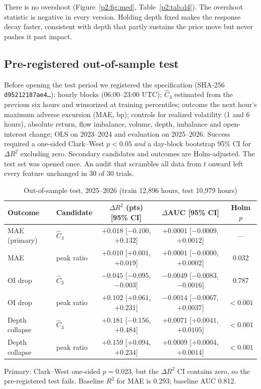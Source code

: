 There is no overshoot (Figure~\ref{p2:fig:med}, Table~\ref{p2:tab:d4}). The overshoot statistic is negative in every version. Holding depth fixed makes the response decay faster, consistent with depth that partly sustains the price move but never pushes it past impact.

\subsection{Pre-registered out-of-sample test}
Before opening the test period we registered the specification (SHA-256 \texttt{d95212187ae4\ldots}): hourly blocks (06:00--23:00 UTC); $\hat C_3$ estimated from the previous six hours and winsorized at training percentiles; outcome the next hour's maximum adverse excursion (MAE, bp); controls for realized volatility (1 and 6 hours), absolute return, flow imbalance, volume, depth, imbalance and open-interest change; OLS on 2023--2024 and evaluation on 2025--2026. Success required a one-sided Clark--West $p<0.05$ \emph{and} a day-block bootstrap 95\% CI for $\Delta R^2$ excluding zero. Secondary candidates and outcomes are Holm-adjusted. The test set was opened once. An audit that scrambles all data from $t$ onward left every feature unchanged in 30 of 30 trials.

\begin{table}[t]\centering
\begin{threeparttable}
\caption{Out-of-sample test, 2025--2026 (train 12,896 hours, test 10,979 hours)}\label{p2:tab:d8}
\small\setlength{\tabcolsep}{4pt}
\begin{tabular}{llccc}
\toprule
Outcome & Candidate & $\Delta R^2$ (pts) [95\% CI] & $\Delta$AUC [95\% CI] & Holm $p$\\
\midrule
MAE (primary) & $\hat C_3$ & $+0.018$ [$-0.100$, $+0.132$] & $+0.0001$ [$-0.0009$, $+0.0012$] & ---\\
MAE & peak ratio & $+0.010$ [$+0.001$, $+0.019$] & $+0.0001$ [$-0.0000$, $+0.0002$] & 0.032\\
OI drop & $\hat C_3$ & $-0.045$ [$-0.095$, $-0.003$] & $-0.0049$ [$-0.0083$, $-0.0016$] & 0.787\\
OI drop & peak ratio & $+0.102$ [$+0.061$, $+0.231$] & $-0.0014$ [$-0.0067$, $+0.0037$] & $<0.001$\\
Depth collapse & $\hat C_3$ & $+0.181$ [$-0.156$, $+0.484$] & $+0.0071$ [$+0.0041$, $+0.0105$] & $<0.001$\\
Depth collapse & peak ratio & $+0.159$ [$+0.094$, $+0.234$] & $+0.0009$ [$+0.0004$, $+0.0014$] & $<0.001$\\
\bottomrule
\end{tabular}
\begin{tablenotes}\footnotesize\item Primary: Clark--West one-sided $p=0.023$, but the $\Delta R^2$ CI contains zero, so the pre-registered test fails. Baseline $R^2$ for MAE is 0.293; baseline AUC 0.812. \end{tablenotes}
\end{threeparttable}
\end{table}

